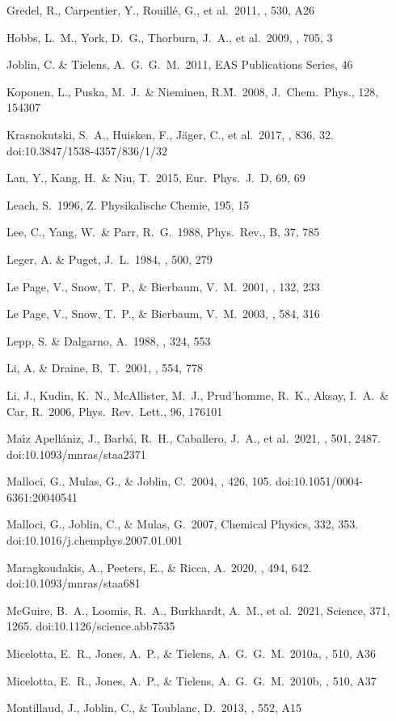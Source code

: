\documentclass{aa}
\begin{document}
Gredel, R., Carpentier, Y., Rouill{\'e}, G., et al.\ 2011, \aap, 530, A26 


Hobbs, L.~M., York, D.~G., Thorburn, J.~A., et al.\ 2009, \apj, 705, 3

Joblin, C. \& Tielens, A.~G.~G.~M.\ 2011, EAS Publications Series, 46

Koponen, L., Puska, M.~J.\ \& Nieminen, R.\~M.\ 2008, J.\ Chem.\ Phys., 128, 154307

Krasnokutski, S.~A., Huisken, F., J{\"a}ger, C., et al.\ 2017, \apj, 836, 
32. doi:10.3847/1538-4357/836/1/32

Lan, Y., Kang, H.\ \& Niu, T.\ 2015, Eur.\ Phys.\ J.\ D, 69, 69


Leach, S.\ 1996, Z. Physikalische Chemie, 195, 15

Lee, C., Yang, W.\ \& Parr, R.~G.\ 1988, Phys.\ Rev., B,  37, 785

Leger, A. \& Puget, J.~L.\ 1984, \aap, 500, 279

Le Page, V., Snow, T.~P., \& Bierbaum, V.~M.\ 2001, \apjs, 132, 233 

Le Page, V., Snow, T.~P., \& Bierbaum, V.~M.\ 2003, \apj, 584, 316 

Lepp, S. \& Dalgarno, A.\ 1988, \apj, 324, 553

Li, A. \& Draine, B.~T.\ 2001, \apj, 554, 778

Li, J., Kudin, K.~N.,  McAllister, M.~J., Prud’homme, R.~K., Aksay, I.~A.\ \& Car, R.\ 2006, Phys.\ Rev.\ Lett., 96, 176101

Ma{\'\i}z Apell{\'a}niz, J., Barb{\'a}, R.~H., Caballero, J.~A., et al.\ 2021, \mnras, 501, 2487. doi:10.1093/mnras/staa2371

Malloci, G., Mulas, G., \& Joblin, C.\ 2004, \aap, 426, 105. doi:10.1051/0004-6361:20040541

Malloci, G., Joblin, C., \& Mulas, G.\ 2007, Chemical Physics, 332, 353. doi:10.1016/j.chemphys.2007.01.001

Maragkoudakis, A., Peeters, E., \& Ricca, A.\ 2020, \mnras, 494, 642. doi:10.1093/mnras/staa681

McGuire, B.~A., Loomis, R.~A., Burkhardt, A.~M., et al.\ 2021, Science, 371, 1265. doi:10.1126/science.abb7535

Micelotta, E.~R., Jones, A.~P., \& Tielens, A.~G.~G.~M.\ 2010a, \aap, 510, A36 

Micelotta, E.~R., Jones, A.~P., \& Tielens, A.~G.~G.~M.\ 2010b, \aap, 510, A37 

Montillaud, J., Joblin, C., \& Toublanc, D.\ 2013, \aap, 552, A15 
\end{document}
